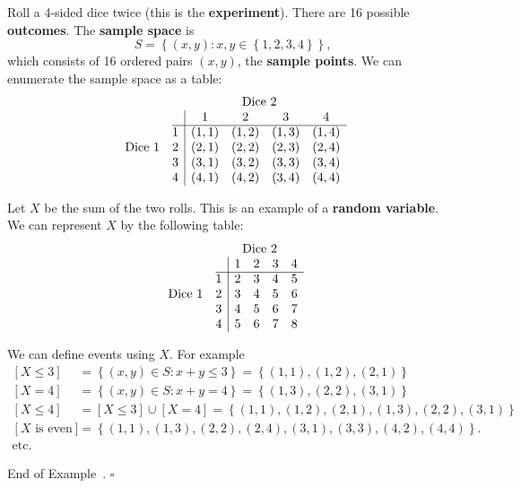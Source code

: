 \documentclass[10pt]{article}
\theoremstyle{definition}
\newtheorem{example}[theorem]{Example}
\renewenvironment{example}
{\begin{oldexample}}
  {\par\smallskip\hfill   End of Example~\theexample. $\square$    \par\end{oldexample}}
\newcommand{\1}[1]{\textbf{1}_{\left[#1\right]}} %
\begin{document}
\begin{example}[sum 2d4]
  \label{ex:sum-2d4}
  Roll a 4-sided dice twice (this is the \textbf{experiment}). There are 16 possible
  \textbf{outcomes}. The \textbf{sample space} is
  \begin{equation*}
    S = \left\{(x,y): x,y\in \left\{1,2,3,4\right\} \right\},
  \end{equation*}
  which consists of 16 ordered pairs $(x,y)$, the \textbf{sample points}. We
  can enumerate the sample space as a table:
  \begin{equation*}
    \begin{array}{c@{\quad}c|cccc}
      & \multicolumn{5}{c}{\text{Dice 2}} \\
      & & 1 & 2 & 3 & 4 \\
      \cline{2-6}
      & 1 & (1,1) & (1,2) & (1,3) & (1,4) \\
      \text{Dice 1}
      & 2 & (2,1) & (2,2) & (2,3) & (2,4) \\
      & 3 & (3,1) & (3,2) & (3,3) & (3,4) \\
      & 4 & (4,1) & (4,2) & (3,4) & (4,4)
    \end{array}
  \end{equation*}
  
  Let $X$ be the sum of the two rolls. This is an example of a \textbf{random
    variable}. We can represent $X$ by the following table:
  \begin{equation*}
    \begin{array}{c@{\quad}c|cccc}
      & \multicolumn{5}{c}{\text{Dice 2}} \\
      & & 1 & 2 & 3 & 4 \\
      \cline{2-6}
      & 1 & 2 & 3 & 4 & 5 \\
      \text{Dice 1}
      & 2 & 3 & 4 & 5 & 6 \\
      & 3 & 4 & 5 & 6 & 7 \\
      & 4 & 5 & 6 & 7 & 8
    \end{array}
  \end{equation*}

  We can define events using $X$. For example
  \begin{align*}
    \left[ X \leq 3\right] &= \left\{(x,y)\in S: x+y\leq 3\right\} =  \left\{(1,1), (1,2), (2,1)\right\} \\
    [X = 4]  &= \left\{(x,y)\in S: x+y=4\right\} = \left\{(1,3), (2,2), (3,1)\right\}\\
    [X \leq 4]  &= \left[ X \leq 3\right]\cup \left[ X=4 \right]= \left\{(1,1), (1,2), (2,1),(1,3), (2,2), (3,1)\right\}\\
    \left[ X \text{ is even} \right] &= \left\{(1,1), (1,3), (2,2), (2,4), (3,1), (3,3), (4,2), (4,4) \right\}.\\
                           \text{etc.}&
  \end{align*}
\end{example}
\end{document}
